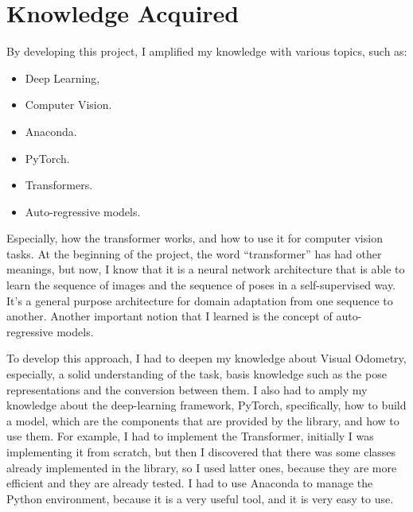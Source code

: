 \section{Knowledge Acquired}\label{sec:knowledge-acquired}
By developing this project, I amplified my knowledge with various topics, such as:
\begin{itemize}
    \item Deep Learning,
    \item Computer Vision.
    \item Anaconda.
    \item PyTorch.
    \item Transformers.
    \item Auto-regressive models.
\end{itemize}
Especially, how the transformer works, and how to use it for computer vision tasks.
At the beginning of the project, the word ``transformer'' has had other meanings, but now, I know that it is a neural network architecture that is able to learn the sequence of images and the sequence of poses in a self-supervised way.
It's a general purpose architecture for domain adaptation from one sequence to another.
Another important notion that I learned is the concept of auto-regressive models.

To develop this approach, I had to deepen my knowledge about Visual Odometry, especially, a solid understanding of the task, basis knowledge such as the pose representations and the conversion between them.
I also had to amply my knowledge about the deep-learning framework, PyTorch, specifically, how to build a model, which are the components that are provided by the library, and how to use them.
For example, I had to implement the Transformer, initially I was implementing it from scratch, but then I discovered that there was some classes already implemented in the library, so I used latter ones, because they are more efficient and they are already tested.
I had to use Anaconda to manage the Python environment, because it is a very useful tool, and it is very easy to use.
